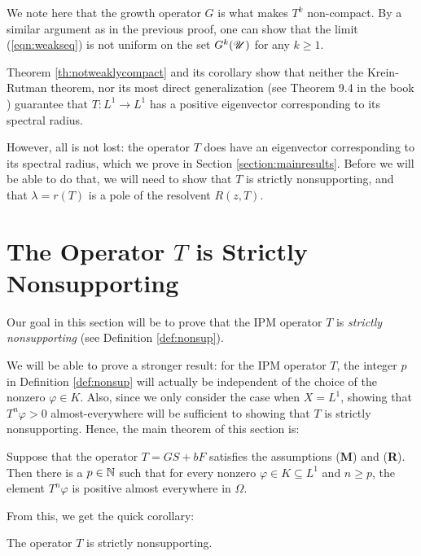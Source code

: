 We note here that the growth operator $G$ is what makes $T^k$ non-compact. By a similar argument as in the previous proof, one can show that the limit (\ref{eqn:weakseq}) is not uniform on the set $G^k(\mathscr U)$ for any $k \geq 1$.

Theorem \ref{th:notweaklycompact} and its corollary show that neither the Krein-Rutman theorem, nor its most direct generalization (see Theorem 9.4 in the book \cite{Kras1989}) guarantee that $T:L^1 \to L^1$ has a positive eigenvector corresponding to its spectral radius. 

However, all is not lost: the operator $T$ does have an eigenvector corresponding to its spectral radius, which we prove in Section \ref{section:mainresults}. Before we will be able to do that, we will need to show that $T$ is strictly nonsupporting, and that $\lambda = r(T)$ is a pole of the resolvent $R(z, T)$.

\section{The Operator $T$ is Strictly Nonsupporting} \label{section:nonsup}

Our goal in this section will be to prove that the IPM operator $T$ is \emph{strictly nonsupporting} (see Definition \ref{def:nonsup}). 

We will be able to prove a stronger result: for the IPM operator $T$, the integer $p$ in Definition \ref{def:nonsup} will actually be independent of the choice of the nonzero $\varphi \in K$. Also, since we only consider the case when $X = L^1$, showing that $T^n\varphi >0$ almost-everywhere will be sufficient to showing that $T$ is strictly nonsupporting. Hence, the main theorem of this section is:

\begin{theorem} \label{th:nonsup}
	Suppose that the operator $T = GS + bF$ satisfies the assumptions (\textbf{M}) and (\textbf{R}). Then there is a $p \in \mathbb{N}$ such that for every nonzero $\varphi \in K \subseteq L^1$ and $n \geq p$, the element $T^n \varphi$ is positive almost everywhere in $\Omega$.
\end{theorem}
From this, we get the quick corollary:
\begin{corollary} \label{th:cortononsup}
	The operator $T$ is strictly nonsupporting.
\end{corollary}


